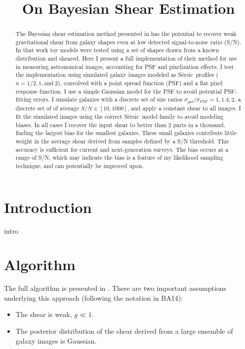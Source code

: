 \documentclass[12pt,preprint]{aastex}
\newcommand{\sersic}{S\'{e}rsic}
\begin{document}
\title{On Bayesian Shear Estimation}



\begin{abstract}

The Bayesian shear estimation method presented in \cite{ba14} has the potential
to recover weak gravitational shear from galaxy shapes even at low detected
signal-to-noise ratio (S/N).  In that work toy models were tested using a set
of shapes drawn from a known distribution and sheared.  Here I present a full
implementation of their method for use in measuring astronomical images,
accounting for PSF and pixelization effects.  I test the implementation using
simulated galaxy images modeled as \sersic\ profiles ($n=1/2, 1, \textrm{and} ~
2$), convolved with a point spread function (PSF) and a flat pixel response
function.  I use a simple Gaussian model for the PSF to avoid potential
PSF-fitting errors. I simulate galaxies with a discrete set of size ratios
$\sigma_{gal}/\sigma_{PSF} = 1, 1.4, 2$, a discrete set of of average $S/N \in
[10,1000]$, and apply a constant shear to all images. I fit the simulated
images using the correct \sersic\ model family to avoid modeling biases.   In
all cases I recover the input shear to better than 2 parts in a thousand,
finding the largest bias for the smallest galaxies.  These small galaxies
contribute little weight in the average shear derived from samples defined by a
S/N threshold.  This accuracy is sufficient for current and next-generation
surveys.  The bias occurs at a range of S/N, which may indicate the bias is a
feature of my likelihood sampling technique, and can potentially be improved
upon.   

\end{abstract}

\section{Introduction} \label{sec:intro}

intro

\section{Algorithm} \label{sec:algo}

The full algorithm is presented in \citet[][BA14]{ba14}.  There are two
important assumptions underlying this approach (following the notation in
BA14):

\begin{itemize}

    \item The shear is weak, $g \ll 1$.

    \item The posterior distribution of the shear derived from a large ensemble
        of galaxy images is Gaussian.

\end{itemize}
\end{document}
